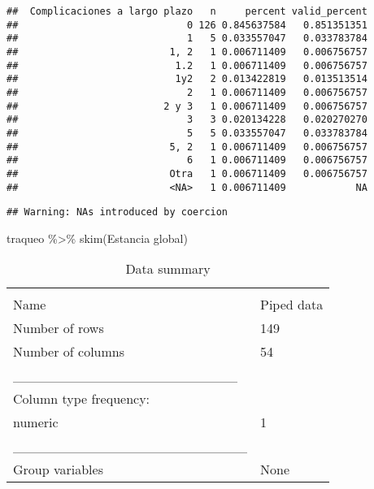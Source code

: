 \documentclass[
]{article}
\newenvironment{Shaded}{\begin{snugshade}}{\end{snugshade}}
\newcommand{\AttributeTok}[1]{\textcolor[rgb]{0.77,0.63,0.00}{#1}}
\newcommand{\DocumentationTok}[1]{\textcolor[rgb]{0.56,0.35,0.01}{\textbf{\textit{#1}}}}
\newcommand{\FunctionTok}[1]{\textcolor[rgb]{0.00,0.00,0.00}{#1}}
\newcommand{\NormalTok}[1]{#1}
\newcommand{\OtherTok}[1]{\textcolor[rgb]{0.56,0.35,0.01}{#1}}
\newcommand{\SpecialCharTok}[1]{\textcolor[rgb]{0.00,0.00,0.00}{#1}}
\newcommand{\StringTok}[1]{\textcolor[rgb]{0.31,0.60,0.02}{#1}}
\begin{document}
\begin{verbatim}
##  Complicaciones a largo plazo   n     percent valid_percent
##                             0 126 0.845637584   0.851351351
##                             1   5 0.033557047   0.033783784
##                          1, 2   1 0.006711409   0.006756757
##                           1.2   1 0.006711409   0.006756757
##                           1y2   2 0.013422819   0.013513514
##                             2   1 0.006711409   0.006756757
##                         2 y 3   1 0.006711409   0.006756757
##                             3   3 0.020134228   0.020270270
##                             5   5 0.033557047   0.033783784
##                          5, 2   1 0.006711409   0.006756757
##                             6   1 0.006711409   0.006756757
##                          Otra   1 0.006711409   0.006756757
##                          <NA>   1 0.006711409            NA
\end{verbatim}

\begin{Shaded}
\end{Shaded}

\begin{verbatim}
## Warning: NAs introduced by coercion
\end{verbatim}

\begin{Shaded}
\begin{Highlighting}[]
\NormalTok{traqueo }\SpecialCharTok{\%\textgreater{}\%}
  \FunctionTok{skim}\NormalTok{(}\StringTok{\textasciigrave{}}\AttributeTok{Estancia global}\StringTok{\textasciigrave{}}\NormalTok{)}
\end{Highlighting}
\end{Shaded}

\begin{longtable}[]{@{}ll@{}}
\caption{Data summary}\tabularnewline
\toprule
& \\
\midrule
\endfirsthead
\toprule
& \\
\midrule
\endhead
Name & Piped data \\
Number of rows & 149 \\
Number of columns & 54 \\
\_\_\_\_\_\_\_\_\_\_\_\_\_\_\_\_\_\_\_\_\_\_\_ & \\
Column type frequency: & \\
numeric & 1 \\
\_\_\_\_\_\_\_\_\_\_\_\_\_\_\_\_\_\_\_\_\_\_\_\_ & \\
Group variables & None \\
\bottomrule
\end{longtable}
\end{document}
